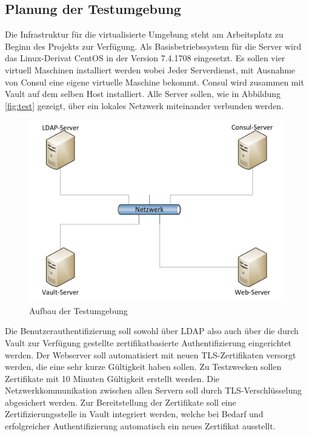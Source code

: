 \documentclass[
book,
a4paper,   
titlepage,  
halfparskip,
12pt        
]{scrartcl}
\begin{document}
\begin{onehalfspacing}
\subsection{Planung der Testumgebung}
\label{subsec:plan}
Die Infrastruktur für die virtualisierte Umgebung steht am Arbeitsplatz zu Beginn des Projekts zur Verfügung. Als Basisbetriebssystem für die Server wird das Linux-Derivat CentOS in der Version 7.4.1708 eingesetzt. Es sollen vier virtuell Maschinen installiert werden wobei Jeder Serverdienst, mit Ausnahme von Consul eine eigene virtuelle Maschine bekommt. Consul wird zusammen mit Vault auf dem selben Host installiert. Alle Server sollen, wie in Abbildung \vref{fig:test} gezeigt, über ein lokales Netzwerk miteinander verbunden werden.\newline

\begin{figure}[h]
	\centering
	\includegraphics[width=1\linewidth]{plan}
	\caption[Netzplan]{Aufbau der Testumgebung}
	\label{fig:test}
\end{figure}

Die Benutzerauthentifizierung soll sowohl über \ac{LDAP} also auch über die durch Vault zur Verfügung gestellte zertifikatbasierte Authentifizierung eingerichtet werden. Der Webserver soll automatisiert mit neuen \ac{TLS}-Zertifikaten versorgt werden, die eine sehr kurze Gültigkeit haben sollen. Zu Testzwecken sollen Zertifikate mit 10 Minuten Gültigkeit erstellt werden. Die Netzwerkkommunikation zwischen allen Servern soll durch \ac{TLS}-Verschlüsselung abgesichert werden. Zur Bereitstellung der Zertifikate soll eine Zertifizierungsstelle in Vault integriert werden, welche bei Bedarf und erfolgreicher Authentifizierung automatisch ein neues Zertifikat ausstellt. 

\end{onehalfspacing}
\end{document}
